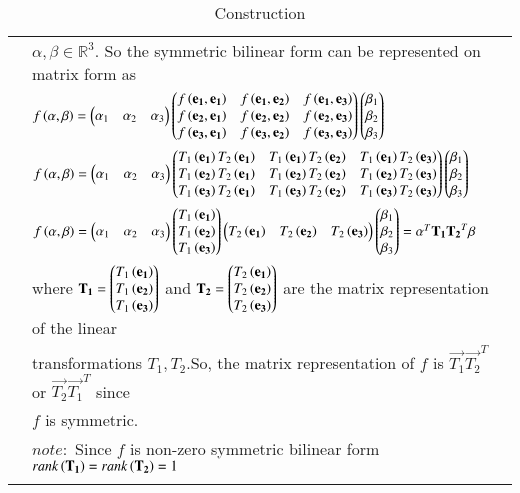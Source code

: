 \documentclass[journal,12pt]{IEEEtran}
\begin{document}
\begin{longtable}{|l|l|}
    &$\alpha,\beta\in\mathbb{R}^3$. So the symmetric bilinear form can be represented on matrix form as\\
    &$f\left(\alpha,\beta\right)=\begin{pmatrix}\alpha_1&\alpha_2&\alpha_3\end{pmatrix}\begin{pmatrix}f\left(\mathbf{e_1},\mathbf{e_1}\right)&f\left(\mathbf{e_1},\mathbf{e_2}\right)&f\left(\mathbf{e_1},\mathbf{e_3}\right)\\f\left(\mathbf{e_2},\mathbf{e_1}\right)&f\left(\mathbf{e_2},\mathbf{e_2}\right)&f\left(\mathbf{e_2},\mathbf{e_3}\right)\\f\left(\mathbf{e_3},\mathbf{e_1}\right)&f\left(\mathbf{e_3},\mathbf{e_2}\right)&f\left(\mathbf{e_3},\mathbf{e_3}\right)\end{pmatrix}\begin{pmatrix}\beta_1\\\beta_2\\\beta_3\end{pmatrix}$\\
    &$f\left(\alpha,\beta\right)=\begin{pmatrix}\alpha_1&\alpha_2&\alpha_3\end{pmatrix}\begin{pmatrix}T_1\left(\mathbf{e_1}\right)T_2\left(\mathbf{e_1}\right)&T_1\left(\mathbf{e_1}\right)T_2\left(\mathbf{e_2}\right)&T_1\left(\mathbf{e_1}\right)T_2\left(\mathbf{e_3}\right)\\T_1\left(\mathbf{e_2}\right)T_2\left(\mathbf{e_1}\right)&T_1\left(\mathbf{e_2}\right)T_2\left(\mathbf{e_2}\right)&T_1\left(\mathbf{e_2}\right)T_2\left(\mathbf{e_3}\right)\\T_1\left(\mathbf{e_3}\right)T_2\left(\mathbf{e_1}\right)&T_1\left(\mathbf{e_3}\right)T_2\left(\mathbf{e_2}\right)&T_1\left(\mathbf{e_3}\right)T_2\left(\mathbf{e_3}\right)\\\end{pmatrix}\begin{pmatrix}\beta_1\\\beta_2\\\beta_3\end{pmatrix}$\\
    &$f\left(\alpha,\beta\right)=\begin{pmatrix}\alpha_1&\alpha_2&\alpha_3\end{pmatrix}\begin{pmatrix}T_1\left(\mathbf{e_1}\right)\\T_1\left(\mathbf{e_2}\right)\\T_1\left(\mathbf{e_3}\right)\end{pmatrix}\begin{pmatrix}T_2\left(\mathbf{e_1}\right)&T_2\left(\mathbf{e_2}\right)&T_2\left(\mathbf{e_3}\right)\end{pmatrix}\begin{pmatrix}\beta_1\\\beta_2\\\beta_3\end{pmatrix}=\alpha^T\mathbf{T_1}\mathbf{T_2}^T\beta$\\
    &where $\mathbf{T_1}=\begin{pmatrix}T_1\left(\mathbf{e_1}\right)\\T_1\left(\mathbf{e_2}\right)\\T_1\left(\mathbf{e_3}\right)\end{pmatrix}$ and $\mathbf{T_2}=\begin{pmatrix}T_2\left(\mathbf{e_1}\right)\\T_2\left(\mathbf{e_2}\right)\\T_2\left(\mathbf{e_3}\right)\end{pmatrix}$ are the matrix representation of the linear\\
    &transformations $T_1,T_2$.So, the matrix representation of $f$ is $\vec{T_1}\vec{T_2}^T$ or $\vec{T_2}\vec{T_1}^T$ since\\
    &$f$ is symmetric.\\
    &$note:$ Since $f$ is non-zero symmetric bilinear form $rank\left(\mathbf{T_1}\right)=rank\left(\mathbf{T_2}\right)=1$\\
    \hline
    \caption{Construction}
    \label{tab:Cons}
\end{longtable}
\end{document}
